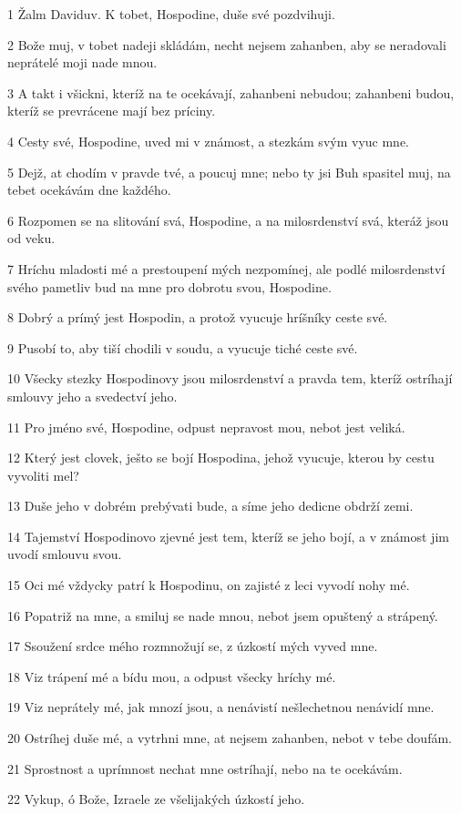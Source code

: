 \par 1 Žalm Daviduv. K tobet, Hospodine, duše své pozdvihuji.
\par 2 Bože muj, v tobet nadeji skládám, necht nejsem zahanben, aby se neradovali neprátelé moji nade mnou.
\par 3 A takt i všickni, kteríž na te ocekávají, zahanbeni nebudou; zahanbeni budou, kteríž se prevrácene mají bez príciny.
\par 4 Cesty své, Hospodine, uved mi v známost, a stezkám svým vyuc mne.
\par 5 Dejž, at chodím v pravde tvé, a poucuj mne; nebo ty jsi Buh spasitel muj, na tebet ocekávám dne každého.
\par 6 Rozpomen se na slitování svá, Hospodine, a na milosrdenství svá, kteráž jsou od veku.
\par 7 Hríchu mladosti mé a prestoupení mých nezpomínej, ale podlé milosrdenství svého pametliv bud na mne pro dobrotu svou, Hospodine.
\par 8 Dobrý a prímý jest Hospodin, a protož vyucuje hríšníky ceste své.
\par 9 Pusobí to, aby tiší chodili v soudu, a vyucuje tiché ceste své.
\par 10 Všecky stezky Hospodinovy jsou milosrdenství a pravda tem, kteríž ostríhají smlouvy jeho a svedectví jeho.
\par 11 Pro jméno své, Hospodine, odpust nepravost mou, nebot jest veliká.
\par 12 Který jest clovek, ješto se bojí Hospodina, jehož vyucuje, kterou by cestu vyvoliti mel?
\par 13 Duše jeho v dobrém prebývati bude, a síme jeho dedicne obdrží zemi.
\par 14 Tajemství Hospodinovo zjevné jest tem, kteríž se jeho bojí, a v známost jim uvodí smlouvu svou.
\par 15 Oci mé vždycky patrí k Hospodinu, on zajisté z leci vyvodí nohy mé.
\par 16 Popatriž na mne, a smiluj se nade mnou, nebot jsem opuštený a strápený.
\par 17 Ssoužení srdce mého rozmnožují se, z úzkostí mých vyved mne.
\par 18 Viz trápení mé a bídu mou, a odpust všecky hríchy mé.
\par 19 Viz neprátely mé, jak mnozí jsou, a nenávistí nešlechetnou nenávidí mne.
\par 20 Ostríhej duše mé, a vytrhni mne, at nejsem zahanben, nebot v tebe doufám.
\par 21 Sprostnost a uprímnost nechat mne ostríhají, nebo na te ocekávám.
\par 22 Vykup, ó Bože, Izraele ze všelijakých úzkostí jeho.

